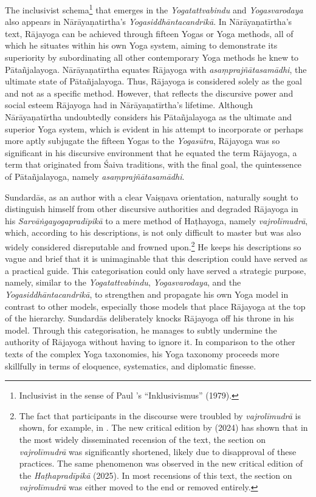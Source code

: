 The inclusivist schema\footnote{Inclusivist in the sense of Paul \citeauthor{hacker1979}'s ``Inklusivismus'' (1979).} that emerges in the \emph{Yogatattvabindu} and \emph{Yogasvarodaya} also appears in Nārāyaṇatirtha's \textit{Yogasiddhāntacandrikā}. In Nārāyaṇatīrtha's text, Rājayoga can be achieved through fifteen Yogas or Yoga methods, all of which he situates within his own Yoga system, aiming to demonstrate its superiority by subordinating all other contemporary Yoga methods he knew to Pātañjalayoga. Nārāyaṇatīrtha equates Rājayoga with \textit{asaṃprajñātasamādhi}, the ultimate state of Pātañjalayoga. Thus, Rājayoga is considered solely as the goal and not as a specific method. However, that reflects the discursive power and social esteem Rājayoga had in Nārāyaṇatīrtha's lifetime. Although Nārāyaṇatīrtha undoubtedly considers his Pātañjalayoga as the ultimate and superior Yoga system, which is evident in his attempt to incorporate or perhaps more aptly subjugate the fifteen Yogas to the \textit{Yogasūtra}, Rājayoga was so significant in his discursive environment that he equated the term Rājayoga, a term that originated from Śaiva traditions, with the final goal, the quintessence of Pātañjalayoga, namely \textit{asaṃprajñātasamādhi}.

Sundardās, as an author with a clear Vaiṣṇava orientation, naturally sought to distinguish himself from other discursive authorities and degraded Rājayoga in his \emph{Sarvāṅgayogapradīpikā} to a mere method of Haṭhayoga, namely \textit{vajrolīmudrā}, which, according to his descriptions, is not only difficult to master but was also widely considered disreputable and frowned upon.\footnote{The fact that participants in the discourse were troubled by \textit{vajrolīmudrā} is shown, for example, in \citeauthor{datta2024}. The new critical edition by \citeauthor{datta2024} (2024) has shown that in the most widely disseminated recension of the text, the section on \textit{vajrolīmudrā} was significantly shortened, likely due to disapproval of these practices. The same phenomenon was observed in the new critical edition of the \emph{Haṭhapradīpikā} (2025). In most recensions of this text, the section on \emph{vajrolīmudrā} was either moved to the end or removed entirely.} He keeps his descriptions so vague and brief that it is unimaginable that this description could have served as a practical guide. This categorisation could only have served a strategic purpose, namely, similar to the \emph{Yogatattvabindu}, \emph{Yogasvarodaya}, and the \textit{Yogasiddhāntacandrikā}, to strengthen and propagate his own Yoga model in contrast to other models, especially those models that place Rājayoga at the top of the hierarchy. Sundardās deliberately knocks Rājayoga off his throne in his model. Through this categorisation, he manages to subtly undermine the authority of Rājayoga without having to ignore it. In comparison to the other texts of the complex Yoga taxonomies, his Yoga taxonomy proceeds more skillfully in terms of eloquence, systematics, and diplomatic finesse.

